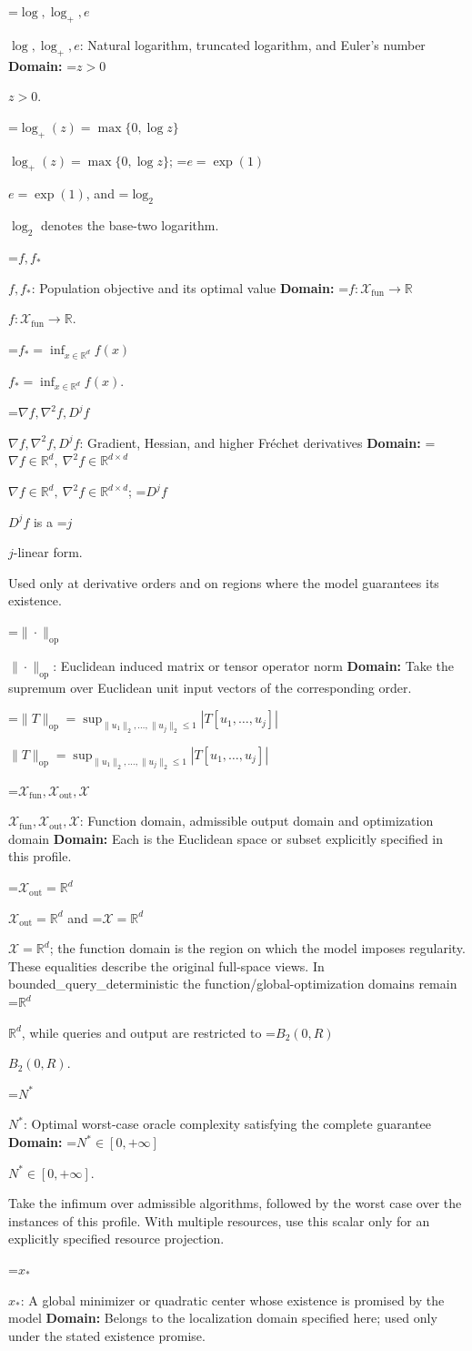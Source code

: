\documentclass[10pt,a4paper]{article}
\newcommand{\AtlasMath}[1]{\par\begingroup\centering\setbox0=\hbox{$\displaystyle #1$}\ifdim\wd0>1.4\linewidth\typeout{ATLAS WIDE FORMULA: \the\wd0}\fi\ifdim\wd0>\linewidth\resizebox{\linewidth}{!}{\box0}\else\box0\fi\par\endgroup}
\newcommand{\AtlasInlineMath}[1]{\begingroup\setbox0=\hbox{$#1$}\ifdim\wd0>.4\linewidth\endgroup\AtlasMath{#1}\else\endgroup$#1$\fi}
\begin{document}
\AtlasInlineMath{\log,\log_+,e}: Natural logarithm, truncated logarithm, and Euler's number \textbf{Domain:} \AtlasInlineMath{z>0}.

\AtlasInlineMath{\log_+(z)=\max\{0,\log z\}}; \AtlasInlineMath{e=\exp(1)}, and \AtlasInlineMath{\log_2} denotes the base-two logarithm.

\AtlasInlineMath{f,f_*}: Population objective and its optimal value \textbf{Domain:} \AtlasInlineMath{f:\mathcal{X}_{\mathrm{fun}}\to\mathbb{R}}.

\AtlasInlineMath{f_*=\inf_{x\in \mathbb{R}^d}f(x)}.

\AtlasInlineMath{\nabla f,\nabla^2f,D^jf}: Gradient, Hessian, and higher Fréchet derivatives \textbf{Domain:} \AtlasInlineMath{\nabla f\in\mathbb{R}^d,\ \nabla^2f\in\mathbb{R}^{d\times d}}; \AtlasInlineMath{D^jf} is a \AtlasInlineMath{j}-linear form.

Used only at derivative orders and on regions where the model guarantees its existence.

\AtlasInlineMath{\|\cdot\|_{\mathrm{op}}}: Euclidean induced matrix or tensor operator norm \textbf{Domain:} Take the supremum over Euclidean unit input vectors of the corresponding order.

\AtlasInlineMath{\|T\|_{\mathrm{op}}=\sup_{\|u_1\|_2,\ldots,\|u_j\|_2\le1}|T[u_1,\ldots,u_j]|}

\AtlasInlineMath{\mathcal{X}_{\mathrm{fun}},\mathcal{X}_{\mathrm{out}},\mathcal{X}}: Function domain, admissible output domain and optimization domain \textbf{Domain:} Each is the Euclidean space or subset explicitly specified in this profile.

\AtlasInlineMath{\mathcal{X}_{\mathrm{out}}=\mathbb{R}^d} and \AtlasInlineMath{\mathcal{X}=\mathbb{R}^d}; the function domain is the region on which the model imposes regularity. These equalities describe the original full-space views. In bounded\_query\_deterministic the function/global-optimization domains remain \AtlasInlineMath{\mathbb R^d}, while queries and output are restricted to \AtlasInlineMath{B_2(0,R)}.

\AtlasInlineMath{N^*}: Optimal worst-case oracle complexity satisfying the complete guarantee \textbf{Domain:} \AtlasInlineMath{N^*\in[0,+\infty]}.

Take the infimum over admissible algorithms, followed by the worst case over the instances of this profile. With multiple resources, use this scalar only for an explicitly specified resource projection.

\AtlasInlineMath{x_*}: A global minimizer or quadratic center whose existence is promised by the model \textbf{Domain:} Belongs to the localization domain specified here; used only under the stated existence promise.
\end{document}
